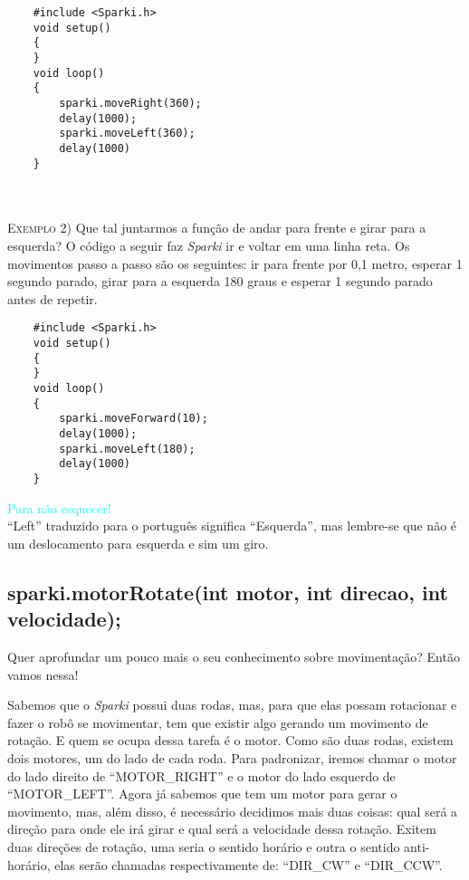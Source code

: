     \begin{verbatim}
    #include <Sparki.h>
    void setup()
    {
    }
    void loop()
    {
        sparki.moveRight(360);
        delay(1000);
        sparki.moveLeft(360);
        delay(1000)
    }
    \end{verbatim}
    \\
    \\
    \textsc{Exemplo 2)} Que tal juntarmos a função de andar para frente e girar para a esquerda? O código a seguir faz \textsl{Sparki} ir e voltar em uma linha reta. Os movimentos passo a passo são os seguintes: ir para frente por 0,1 metro, esperar 1 segundo parado, girar para a esquerda 180 graus e esperar 1 segundo parado antes de repetir.

    \begin{verbatim}
    #include <Sparki.h>
    void setup()
    {
    }
    void loop()
    {
        sparki.moveForward(10);
        delay(1000);
        sparki.moveLeft(180);
        delay(1000)
    }
    \end{verbatim}
    \begin{center}
    
   \textcolor{cyan}{Para não esquecer!}
   \\``Left'' traduzido para o português significa ``Esquerda'', mas lembre-se que não é um deslocamento para esquerda e sim um giro.
    \end{center}
    
\subsection{sparki.motorRotate(int motor, int direcao,  int velocidade);}

Quer aprofundar um pouco mais o seu conhecimento sobre movimentação? Então vamos nessa!

Sabemos que o \textsl{Sparki} possui duas rodas, mas, para que elas possam rotacionar e fazer o robô se movimentar, tem que existir algo gerando um movimento de rotação. E quem se ocupa dessa tarefa é o motor. Como são duas rodas, existem dois motores, um do lado de cada roda. Para padronizar, iremos chamar o motor do lado direito de ``MOTOR\_RIGHT'' e o motor do lado esquerdo de ``MOTOR\_LEFT''. Agora já sabemos que tem um motor para gerar o movimento, mas, além disso, é necessário decidimos mais duas coisas: qual será a direção para onde ele irá girar e qual será a velocidade dessa rotação. Exitem duas direções de rotação, uma seria o sentido horário e outra o sentido anti-horário, elas serão chamadas respectivamente de: ``DIR\_CW'' e ``DIR\_CCW''.

